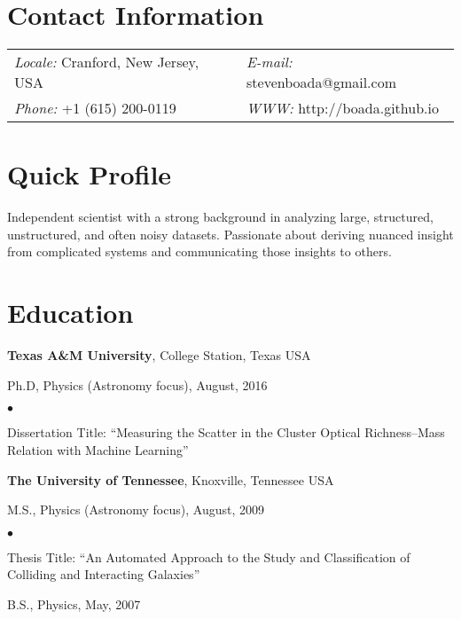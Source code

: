 \documentclass[margin,line, 11pt]{res}
\newenvironment{list1}{
  \begin{list}{\ding{113}}{%
      \setlength{\itemsep}{0in}
      \setlength{\parsep}{0in} \setlength{\parskip}{0in}
      \setlength{\topsep}{0in} \setlength{\partopsep}{0in} 
      \setlength{\leftmargin}{0.17in}}}{\end{list}}
\newenvironment{list2}{
  \begin{list}{$\bullet$}{%
      \setlength{\itemsep}{0in}
      \setlength{\parsep}{0in} \setlength{\parskip}{0in}
      \setlength{\topsep}{0in} \setlength{\partopsep}{0in} 
      \setlength{\leftmargin}{0.2in}}}{\end{list}}
\begin{document}

\begin{resume}
\section{Contact Information}
\begin{tabular}{@{}p{3in}p{3in}}
\textit{Locale:} Cranford, New Jersey, USA & \textit{E-mail:} stevenboada@gmail.com \\            
\textit{Phone:} +1 (615) 200-0119   & \textit{WWW:} http://boada.github.io \\             
\end{tabular}
\vspace*{-6mm}

\section{Quick Profile}
Independent scientist with a strong background in analyzing large, structured, unstructured, and often noisy datasets. Passionate about deriving nuanced insight from complicated systems and communicating those insights to others. 
\vspace*{-5mm}

\section{Education}
\textbf{Texas A\&M University}, College Station, Texas USA\\
\vspace*{-5mm}
\begin{list1}
	\item[]Ph.D, Physics (Astronomy focus), August, 2016
	\begin{list2}
		\item Dissertation Title: ``Measuring the Scatter in the Cluster Optical Richness--Mass Relation with Machine Learning'' 
	\end{list2}
\end{list1}
\vspace*{-5mm}

\textbf{The University of Tennessee}, Knoxville, Tennessee USA\\
\vspace*{-5mm}
\begin{list1}
	\item[] M.S., Physics (Astronomy focus),  August, 2009
	\begin{list2}
		\item Thesis Title: ``An Automated Approach to the Study and Classification of Colliding and Interacting Galaxies''
	\end{list2}
	\item[] B.S., Physics,  May, 2007
\end{list1}
\vspace*{-5mm}


\end{resume}
\end{document}
